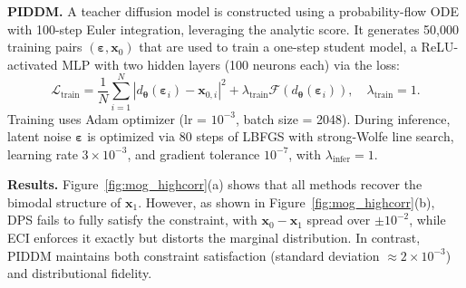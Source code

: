 \documentclass{article}
\theoremstyle{plain}
\theoremstyle{definition}
\theoremstyle{remark}
\def\vx{{\bm{x}}}
\begin{document}
\textbf{PIDDM.} A teacher diffusion model is constructed using a probability-flow ODE with 100-step Euler integration, leveraging the analytic score. It generates 50,000 training pairs $(\boldsymbol{\varepsilon}, \vx_0)$ that are used to train a one-step student model, a ReLU-activated MLP with two hidden layers (100 neurons each) via the loss:
\begin{equation}
\mathcal{L}_{\text{train}} = \frac{1}{N} \sum_{i=1}^{N} \left| d_{\boldsymbol{\theta}}(\boldsymbol{\varepsilon}_i) - \boldsymbol{x}_{0,i} \right|^2 + \lambda_{\text{train}} \mathcal{F}(d_{\boldsymbol{\theta}}(\boldsymbol{\varepsilon}_i)), \quad \lambda_{\text{train}} = 1.
\end{equation}
Training uses Adam optimizer (lr = $10^{-3}$, batch size = 2048). During inference, latent noise $\boldsymbol{\varepsilon}$ is optimized via 80 steps of \textsc{LBFGS} with strong-Wolfe line search, learning rate $3 \times 10^{-3}$, and gradient tolerance $10^{-7}$, with $\lambda_{\text{infer}} = 1$.

\textbf{Results.} Figure~\ref{fig:mog_highcorr}(a) shows that all methods recover the bimodal structure of $\vx_1$. However, as shown in Figure~\ref{fig:mog_highcorr}(b), DPS fails to fully satisfy the constraint, with $\vx_0 - \vx_1$ spread over $\pm 10^{-2}$, while ECI enforces it exactly but distorts the marginal distribution. In contrast, PIDDM maintains both constraint satisfaction (standard deviation $\approx 2\times10^{-3}$) and distributional fidelity.

\end{document}
